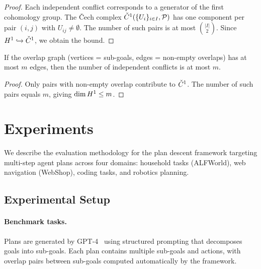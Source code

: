 \documentclass[11pt]{article}
\newcommand{\PlanSheaf}{\mathcal{P}}
\newcommand{\SubGoal}[1]{U_{#1}}
\newcommand{\CoverFam}{\{U_i\}_{i \in I}}
\begin{document}
\begin{proof}
  Each independent conflict corresponds to a generator of the
  first cohomology group.  The Čech complex
  $\Cech^1(\CoverFam, \PlanSheaf)$ has one component per pair
  $(i, j)$ with $\SubGoal{ij} \neq \emptyset$.  The number of
  such pairs is at most $\binom{|I|}{2}$.  Since
  $H^{1} \hookrightarrow \check{C}^1$, we obtain the bound.
\end{proof}

\begin{corollary}\label{cor:sparse}
  If the overlap graph (vertices = sub-goals, edges = non-empty
  overlaps) has at most $m$ edges, then the number of independent
  conflicts is at most $m$.
\end{corollary}

\begin{proof}
  Only pairs with non-empty overlap contribute to $\check{C}^1$.
  The number of such pairs equals $m$, giving
  $\dim H^{1} \leq m$.
\end{proof}

\section{Experiments}\label{sec:experiments}

We describe the evaluation methodology for the plan descent framework
targeting multi-step agent plans across four domains: household tasks
(ALFWorld), web navigation (WebShop), coding tasks, and robotics planning.

\subsection{Experimental Setup}\label{ssec:setup}

\paragraph{Benchmark tasks.}
Plans are generated by GPT-4~\cite{OpenAI2023} using structured
prompting that decomposes goals into sub-goals.  Each plan contains
multiple sub-goals and actions, with overlap pairs between sub-goals
computed automatically by the framework.
\end{document}
